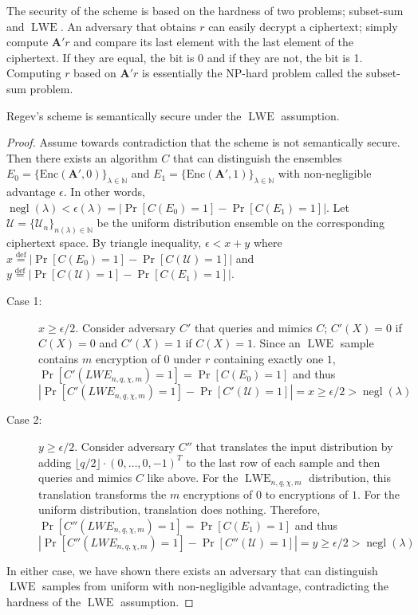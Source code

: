The security of the scheme is based on the hardness of two problems; subset-sum and $\operatorname{LWE}$. An adversary that obtains $r$ can easily decrypt a ciphertext; simply compute $\textbf{A}'r$ and compare its last element with the last element of the ciphertext. If they are equal, the bit is 0 and if they are not, the bit is 1. Computing $r$ based on $\textbf{A}'r$ is essentially the NP-hard problem called the subset-sum problem.
\begin{claim}
    Regev's scheme is semantically secure under the $\operatorname{LWE}$ assumption.
\end{claim}
\begin{proof}
    Assume towards contradiction that the scheme is not semantically secure. Then there exists an algorithm $C$ that can distinguish the ensembles $E_0 = \{\text{Enc}(\textbf{A}',0)\}_{\lambda \in \mathbb{N}}$ and $E_1 = \{\text{Enc}(\textbf{A}',1)\}_{\lambda \in \mathbb{N}}$ with non-negligible advantage $\epsilon$. In other words, $ \operatorname{negl}(\lambda) < \epsilon(\lambda) = |\operatorname{Pr}[C(E_0) = 1] - \operatorname{Pr}[C(E_1) = 1]|$. Let $\mathcal{U} = \{\mathcal{U}_n\}_{n(\lambda) \in \mathbb{N}}$ be the uniform distribution ensemble on the corresponding ciphertext space. By triangle inequality, $\epsilon < x + y$ where $x \stackrel{\mathrm{def}}{=} |\operatorname{Pr}[C(E_0) = 1] - \operatorname{Pr}[C(\mathcal{U}) = 1]|$ and $y \stackrel{\mathrm{def}}{=} |\operatorname{Pr}[C(\mathcal{U}) = 1] - \operatorname{Pr}[C(E_1) = 1]|$.
    \begin{description}
        \item[Case 1:] $x \geq \epsilon / 2$. Consider adversary $C'$ that queries and mimics $C$; $C'(X) = 0$ if $C(X) = 0$ and $C'(X) = 1$ if $C(X) = 1$. Since an $\operatorname{LWE}$ sample contains $m$ encryption of $0$ under $r$ containing exactly one $1$, $\operatorname{Pr}[C'(LWE_{n,q,\chi,m}) = 1] = \operatorname{Pr}[C(E_0) = 1]$ and thus $|\operatorname{Pr}[C'(LWE_{n,q,\chi,m}) = 1] - \operatorname{Pr}[C'(\mathcal{U}) = 1]| = x \geq \epsilon / 2 > \operatorname{negl}(\lambda)$
        \item[Case 2:] $y \geq \epsilon / 2$. Consider adversary $C''$ that translates the input distribution by adding $\lfloor q/2 \rfloor \cdot (0, \dots, 0, -1)^T$ to the last row of each sample and then queries and mimics $C$ like above. For the $\operatorname{LWE}_{n,q,\chi,m}$ distribution, this translation transforms the $m$ encryptions of $0$ to encryptions of $1$. For the uniform distribution, translation does nothing. Therefore, $\operatorname{Pr}[C''(LWE_{n,q,\chi,m}) = 1] = \operatorname{Pr}[C(E_1) = 1]$ and thus $|\operatorname{Pr}[C''(LWE_{n,q,\chi,m}) = 1] - \operatorname{Pr}[C''(\mathcal{U}) = 1]| = y \geq \epsilon / 2 > \operatorname{negl}(\lambda)$
    \end{description}
    In either case, we have shown there exists an adversary that can distinguish $\operatorname{LWE}$ samples from uniform with non-negligible advantage, contradicting the hardness of the $\operatorname{LWE}$ assumption.
\end{proof}
